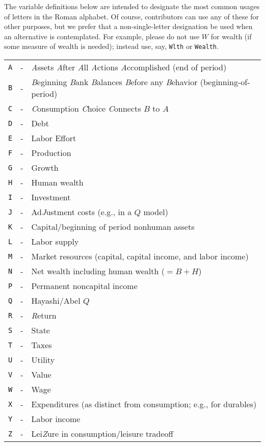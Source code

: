 
The variable definitions below are intended to designate the most common usages of letters in the Roman alphabet.  Of course, contributors can use any of these for other purposes, but we prefer that a non-single-letter designation be used when an alternative is contemplated.  For example, please do not use $W$ for wealth (if some measure of wealth is needed); instead use, say, \texttt{Wlth} or \texttt{Wealth}.

\begin{table}[h]
\begin{tabular}{rcl}
    \texttt{A} & - & {\it A}ssets {\it A}fter {\it A}ll {\it A}ctions {\it A}ccomplished (end of period)
\\  \texttt{B} & - & {\it B}eginning {\it B}ank {\it B}alances {\it B}efore any {\it B}ehavior (beginning-of-period)
\\  \texttt{C} & - & {\it C}onsumption {\it C}hoice {\it C}onnects $B$ to $A$
\\  \texttt{D} & - & Debt
\\  \texttt{E} & - & Labor Effort
\\  \texttt{F} & - & Production
\\  \texttt{G} & - & Growth
\\  \texttt{H} & - & Human wealth
\\  \texttt{I} & - & Investment
\\  \texttt{J} & - & Ad{\it J}ustment costs (e.g., in a $Q$ model)
\\  \texttt{K} & - & Capital/beginning of period nonhuman assets
\\  \texttt{L} & - & Labor supply
\\  \texttt{M} & - & Market resources (capital, capital income, and labor income)
\\  \texttt{N} & - & Net wealth including human wealth ($=B + H$)
\\  \texttt{P} & - & Permanent noncapital income
\\  \texttt{Q} & - & Hayashi/Abel $Q$
\\  \texttt{R} & - & {\it R}eturn
\\  \texttt{S} & - & State
\\  \texttt{T} & - & Taxes
\\  \texttt{U} & - & Utility
\\  \texttt{V} & - & Value
\\  \texttt{W} & - & Wage
\\  \texttt{X} & - & Expenditures (as distinct from consumption; e.g., for durables)
\\  \texttt{Y} & - & Labor income
\\  \texttt{Z} & - & Lei{\it Z}ure in consumption/leisure tradeoff
\end{tabular}
\end{table}

